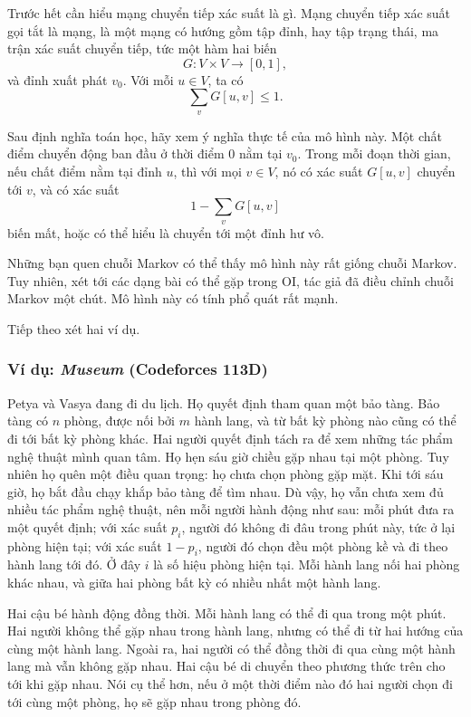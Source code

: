 \documentclass[11pt]{article}
\begin{document}
Trước hết cần hiểu mạng chuyển tiếp xác suất là gì. Mạng chuyển tiếp xác suất
gọi tắt là mạng, là một mạng có hướng gồm tập đỉnh, hay tập trạng thái, ma
trận xác suất chuyển tiếp, tức một hàm hai biến
\[
  G:V\times V\to [0,1],
\]
và đỉnh xuất phát \(v_0\). Với mỗi \(u\in V\), ta có
\[
  \sum_v G[u,v]\le 1.
\]

Sau định nghĩa toán học, hãy xem ý nghĩa thực tế của mô hình này. Một chất
điểm chuyển động ban đầu ở thời điểm \(0\) nằm tại \(v_0\). Trong mỗi đoạn
thời gian, nếu chất điểm nằm tại đỉnh \(u\), thì với mọi \(v\in V\), nó có
xác suất \(G[u,v]\) chuyển tới \(v\), và có xác suất
\[
  1-\sum_v G[u,v]
\]
biến mất, hoặc có thể hiểu là chuyển tới một đỉnh hư vô.

Những bạn quen chuỗi Markov có thể thấy mô hình này rất giống chuỗi Markov.
Tuy nhiên, xét tới các dạng bài có thể gặp trong OI, tác giả đã điều chỉnh
chuỗi Markov một chút. Mô hình này có tính phổ quát rất mạnh.

Tiếp theo xét hai ví dụ.

\subsubsection{Ví dụ: \emph{Museum} (Codeforces 113D)}

Petya và Vasya đang đi du lịch. Họ quyết định tham quan một bảo tàng. Bảo
tàng có \(n\) phòng, được nối bởi \(m\) hành lang, và từ bất kỳ phòng nào
cũng có thể đi tới bất kỳ phòng khác. Hai người quyết định tách ra để xem
những tác phẩm nghệ thuật mình quan tâm. Họ hẹn sáu giờ chiều gặp nhau tại
một phòng. Tuy nhiên họ quên một điều quan trọng: họ chưa chọn phòng gặp mặt.
Khi tới sáu giờ, họ bắt đầu chạy khắp bảo tàng để tìm nhau. Dù vậy, họ vẫn
chưa xem đủ nhiều tác phẩm nghệ thuật, nên mỗi người hành động như sau: mỗi
phút đưa ra một quyết định; với xác suất \(p_i\), người đó không đi đâu trong
phút này, tức ở lại phòng hiện tại; với xác suất \(1-p_i\), người đó chọn
đều một phòng kề và đi theo hành lang tới đó. Ở đây \(i\) là số hiệu phòng
hiện tại. Mỗi hành lang nối hai phòng khác nhau, và giữa hai phòng bất kỳ có
nhiều nhất một hành lang.

Hai cậu bé hành động đồng thời. Mỗi hành lang có thể đi qua trong một phút.
Hai người không thể gặp nhau trong hành lang, nhưng có thể đi từ hai hướng
của cùng một hành lang. Ngoài ra, hai người có thể đồng thời đi qua cùng một
hành lang mà vẫn không gặp nhau. Hai cậu bé di chuyển theo phương thức trên
cho tới khi gặp nhau. Nói cụ thể hơn, nếu ở một thời điểm nào đó hai người
chọn đi tới cùng một phòng, họ sẽ gặp nhau trong phòng đó.
\end{document}
